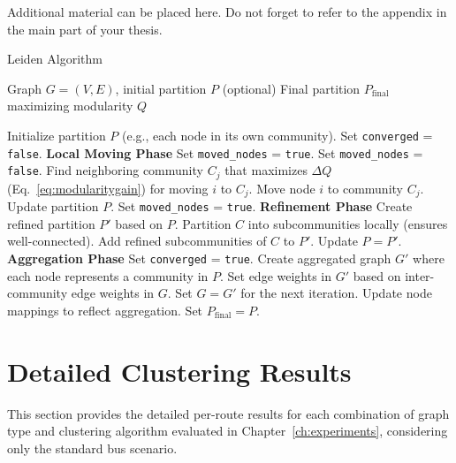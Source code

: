 \begin{appendix}
Additional material can be placed here. Do not forget to refer to the appendix in the main part of your thesis.

\begin{algorithm}[H]
\caption{Leiden Algorithm}
\label{alg:leiden_appendix}
\begin{algorithmic}[1]
\Require Graph $G = (V, E)$, initial partition $P$ (optional)
\Ensure Final partition $P_{\text{final}}$ maximizing modularity $Q$

\State Initialize partition $P$ (e.g., each node in its own community).
\State Set \texttt{converged} = \texttt{false}.
    \State \textbf{Local Moving Phase}
    \State Set \texttt{moved\_nodes} = \texttt{true}.
        \State Set \texttt{moved\_nodes} = \texttt{false}.
            \State Find neighboring community $C_j$ that maximizes $\Delta Q$ (Eq.~\eqref{eq:modularitygain}) for moving $i$ to $C_j$.
                \State Move node $i$ to community $C_j$.
                \State Update partition $P$.
                \State Set \texttt{moved\_nodes} = \texttt{true}.
            \EndIf
        \EndFor
    \EndWhile
    \State \textbf{Refinement Phase}
    \State Create refined partition $P'$ based on $P$.
        \State Partition $C$ into subcommunities locally (ensures well-connected).
        \State Add refined subcommunities of $C$ to $P'$.
    \EndFor
    \State Update $P = P'$.
    \State \textbf{Aggregation Phase}
        \State Set \texttt{converged} = \texttt{true}.
    \Else
        \State Create aggregated graph $G'$ where each node represents a community in $P$.
        \State Set edge weights in $G'$ based on inter-community edge weights in $G$.
        \State Set $G = G'$ for the next iteration.
        \State Update node mappings to reflect aggregation.
    \EndIf
\EndWhile
\State Set $P_{\text{final}} = P$.
\end{algorithmic}
\end{algorithm}

\section{Detailed Clustering Results}
\label{sec:appendix_detailed_results}

This section provides the detailed per-route results for each combination of graph type and clustering algorithm evaluated in Chapter~\ref{ch:experiments}, considering only the standard bus scenario.


\end{appendix}
